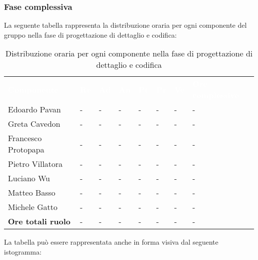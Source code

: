 \subsubsection{Fase complessiva}
La seguente tabella rappresenta la distribuzione oraria per ogni componente del gruppo nella fase di progettazione di dettaglio e codifica:
\begin{table}[!htbp]
\begin{center}
\renewcommand{\arraystretch}{1.25}
\begin{tabular}{ m{}<{\centering}  m{}<{\centering} m{}<{\centering} m{}<{\centering}  m{}<{\centering}  m{}<{\centering}  m{}<{\centering}  m{}<{\centering}   }
	\rowcolor{darkblue}
	\textcolor{white}{\textbf{Componente}} &\textcolor{white}{\textbf{Re}}&\textcolor{white}{\textbf{Ad}}&\textcolor{white}{\textbf{An}}&\textcolor{white}{\textbf{Pt}}&\textcolor{white}{\textbf{Pr}}&\textcolor{white}{\textbf{Ve}}&\textcolor{white}{\textbf{Ore complessive}}\\ 

	Edoardo Pavan & - & - & - & - & - & - & -\\	

	Greta Cavedon & - & - & - & - & - & - & -\\
	
	Francesco Protopapa & - & - & - & - & - & - & -\\
	
	Pietro Villatora & - & - & - & - & - & - & -\\
	
	Luciano Wu & - & - & - & - & - & - & -\\
	
	Matteo Basso & - & - & - & - & - & - & -\\
	
	Michele Gatto & - & - & - & - & - & - & -\\
	
	\textbf{Ore totali ruolo} & - & - & - & - & - & - & -\\

\end{tabular}
\caption{Distribuzione oraria per ogni componente nella fase di progettazione di dettaglio e codifica}
\end{center}
\end{table}

La tabella può essere rappresentata anche in forma visiva dal seguente istogramma:

